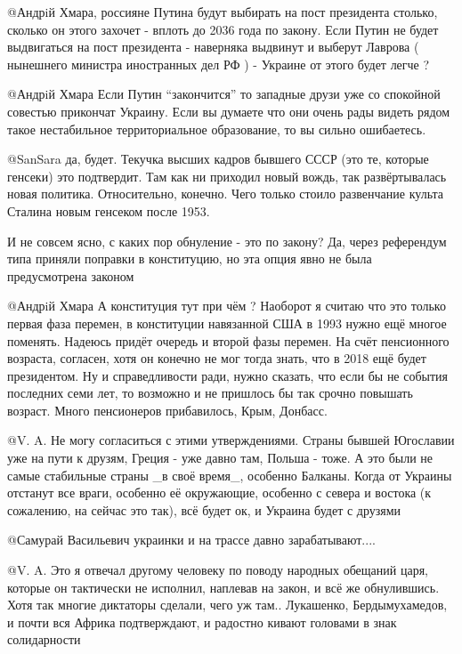 \begin{itemize}
\begin{itemize}

@Андрiй Хмара, россияне Путина будут выбирать на пост президента столько,
сколько он этого захочет - вплоть до 2036 года по закону. Если Путин не будет
выдвигаться на пост президента - наверняка выдвинут и выберут Лаврова (
нынешнего министра иностранных дел РФ ) - Украине от этого будет легче ?


@Андрiй Хмара  Если Путин \enquote{закончится} то западные друзи уже со спокойной
совестью прикончат Украину. Если вы думаете что они очень рады видеть рядом
такое нестабильное территориальное образование, то вы сильно ошибаетесь.


@SanSara  да, будет. Текучка высших кадров бывшего СССР (это те, которые
генсеки) это подтвердит. Там как ни приходил новый вождь, так развёртывалась
новая политика. Относительно, конечно. Чего только стоило развенчание культа
Сталина новым генсеком после 1953.

И не совсем ясно, с каких пор обнуление - это по закону? Да, через референдум
типа приняли поправки в конституцию, но эта опция явно не была предусмотрена
законом


@Андрiй Хмара  А конституция тут при чём ? Наоборот я считаю что это только
первая фаза перемен, в конституции навязанной США в 1993 нужно ещё многое
поменять. Надеюсь придёт очередь и второй фазы перемен. На счёт пенсионного
возраста, согласен, хотя он конечно не мог тогда знать, что в 2018 ещё
будет президентом. Ну и справедливости ради, нужно сказать, что если бы не
события последних семи лет, то возможно и не пришлось бы так срочно повышать
возраст. Много пенсионеров прибавилось, Крым, Донбасс.


@V. A.  Не могу согласиться с этими утверждениями. Страны бывшей Югославии уже
на пути к друзям, Греция - уже давно там, Польша - тоже. А это были не самые
стабильные страны \_в своё время\_, особенно Балканы. Когда от Украины отстанут
все враги, особенно её окружающие, особенно с севера и востока (к сожалению,
на сейчас это так), всё будет ок, и Украина будет с друзями


@Самурай Васильевич  украинки и на трассе давно зарабатывают....


@V. A.  Это я отвечал другому человеку по поводу народных обещаний царя,
которые он тактически не исполнил, наплевав на закон, и всё же обнулившись.
Хотя так многие диктаторы сделали, чего уж там.. Лукашенко, Бердымухамедов, и
почти вся Африка подтверждают, и радостно кивают головами в знак солидарности


\end{itemize}
\end{itemize}
